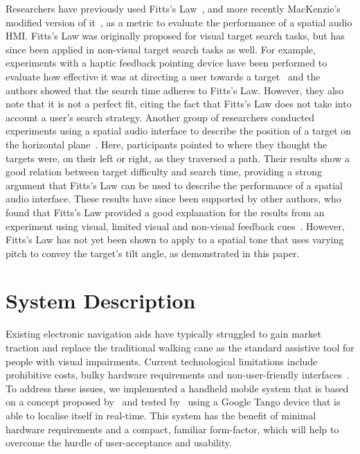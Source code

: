 \documentclass[]{interact}
\begin{document}
Researchers have previously used Fitts's Law~\citep{fitts1954information}, and more recently MacKenzie's modified version of it~\citep{mackenzie1992fitts}, as a metric to evaluate the performance of a spatial audio HMI\@.
Fitts's Law was originally proposed for visual target search tasks, but has since been applied in non-visual target search tasks as well.
For example, experiments with a haptic feedback pointing device have been performed to evaluate how effective it was at directing a user towards a target~\citep{ahmaniemi2009augmented} and the authors showed that the search time adheres to Fitts's Law.
However, they also note that it is not a perfect fit, citing the fact that Fitts's Law does not take into account a user's search strategy.
Another group of researchers conducted experiments using a spatial audio interface to describe the position of a target on the horizontal plane~\citep{marentakis2006effects}.
Here, participants pointed to where they thought the targets were, on their left or right, as they traversed a path.
Their results show a good relation between target difficulty and search time, providing a strong argument that Fitts's Law can be used to describe the performance of a spatial audio interface.
These results have since been supported by other authors, who found that Fitts's Law provided a good explanation for the results from an experiment using visual, limited visual and non-visual feedback cues~\citep{wu2010fitts}.
However, Fitts's Law has not yet been shown to apply to a spatial tone that uses varying pitch to convey the target's tilt angle, as demonstrated in this paper.

\section{System Description}\label{sec:system-description}

Existing electronic navigation aids have typically struggled to gain market traction and replace the traditional walking cane as the standard assistive tool for people with visual impairments.
Current technological limitations include prohibitive costs, bulky hardware requirements and non-user-friendly interfaces~\citep{golledge2004stated,yusif2016older,arditi2013user}.
To address these issues, we implemented a handheld mobile system that is based on a concept proposed by~\cite{lock2019active} and tested by~\cite{lock2019bone} using a Google Tango device that is able to localise itself in real-time.
This system has the benefit of minimal hardware requirements and a compact, familiar form-factor, which will help to overcome the hurdle of user-acceptance and usability.
\end{document}

